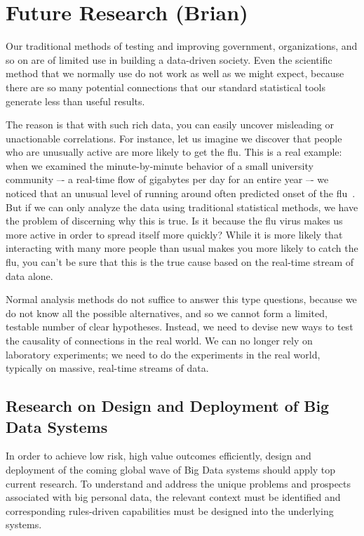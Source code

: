 \section{Future Research (Brian)}

Our traditional methods of testing and improving government, organizations, and so on are of limited use in building a data-driven society.
Even the scientific method that we normally use do not work as well as we might expect, because there are so many potential connections that our standard statistical tools generate less than useful results.

The reason is that with such rich data, you can easily uncover misleading or unactionable correlations.
For instance, let us imagine we discover that people who are unusually active are more likely to get the flu.
This is a real example: when we examined the minute-by-minute behavior of a small university community –- a real-time flow of gigabytes per day for an entire year –- we noticed that an unusual level of running around often predicted onset of the flu~\cite{madan2010social}.
But if we can only analyze the data using traditional statistical methods, we have the problem of discerning why this is true.
Is it because the flu virus makes us more active in order to spread itself more quickly?
While it is more likely that interacting with many more people than usual makes you more likely to catch the flu, you can't be sure that this is the true cause based on the real-time stream of data alone.

Normal analysis methods do not suffice to answer this type questions, because we do not know all the possible alternatives, and so we cannot form a limited, testable number of clear hypotheses.
Instead, we need to devise new ways to test the causality of connections in the real world.
We can no longer rely on laboratory experiments; we need to do the experiments in the real world, typically on massive, real-time streams of data.

\subsection{Research on Design and Deployment of Big Data Systems}

In order to achieve low risk, high value outcomes efficiently, design and deployment of the coming global wave of Big Data systems should apply top current research.
To understand and address the unique problems and prospects associated with big personal data, the relevant context must be identified and corresponding rules-driven capabilities must be designed into the underlying systems.

